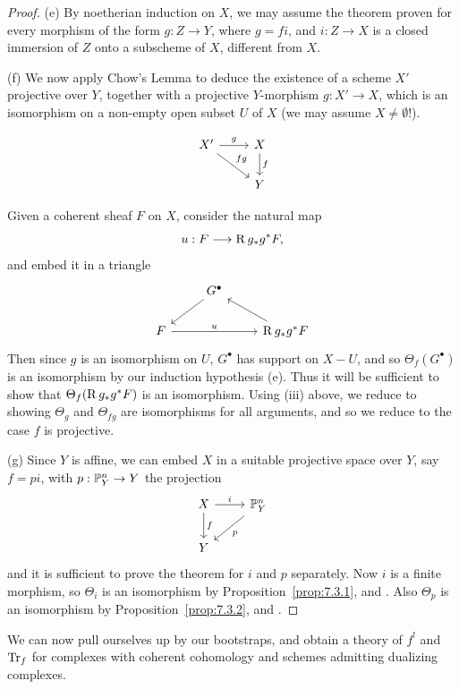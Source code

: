 \begin{proof}
\medskip\noindent(e) By noetherian induction on $X$, we may assume the theorem proven for every morphism of the form $g: Z \to Y$, where $g = fi$, and $i: Z \to X$ is a closed immersion of $Z$ onto a subscheme of $X$, different from $X$.

\medskip\noindent(f) We now apply Chow's Lemma \cite[\nopp II,~5.6.1]{EGA} to deduce the existence of a scheme $X'$ projective over $Y$, together with a projective $Y$-morphism $g: X' \to X$, which is an isomorphism on a non-empty open subset $U$ of $X$ (we may assume $X \neq \emptyset$!).

\[
\begin{tikzcd}
X'\ar[r,"g"]\ar[rd,"fg"]&X\ar[d,"f"]\\
&Y
\end{tikzcd}
\]

Given a coherent sheaf $F$ on $X$, consider the natural map
\[
u: F \longrightarrow \operatorname{R} g_{*} g^{*}F,
\]
and embed it in a triangle
\[
\begin{tikzcd}
	&G^\bullet \ar[ld] \\
	F \ar[rr,"u"]&&\RR g_{*} g^{*}F \ar[lu]
\end{tikzcd}
\]
Then since $g$ is an isomorphism on $U$, $G^{\bullet}$ has support on $X - U$, and so $\Theta_{f}(G^{\bullet})$ is an isomorphism by our induction hypothesis (e). Thus it will be sufficient to show that $\Theta_{f}(\operatorname{R} g_{*} g^{*}F)$ is an isomorphism. Using (iii) above, we reduce to showing $\Theta_{g}$ and $\Theta_{fg}$ are isomorphisms for all arguments, and so we reduce to the case $f$ is projective.

\medskip\noindent(g) Since $Y$ is affine, we can embed $X$ in a suitable projective space over $Y$, say $f = pi$, with $p:\mathbb{P}^n_{Y}\rightarrow Y$ the projection
\[
\begin{tikzcd}
	X\ar[d,"f"]\ar[r,"i"]&\bbP^n_{Y}\ar[ld,"p"] \\
	Y
\end{tikzcd}
\]
and it is sufficient to prove the theorem for $i$ and $p$ separately. Now $i$ is a finite morphism, so $\Theta_{i}$ is an isomorphism by Proposition~\ref{prop:7.3.1}, and . Also $\Theta_{p}$ is an isomorphism by Proposition~\ref{prop:7.3.2}, and .
\end{proof}

We can now pull ourselves up by our bootstraps, and obtain a theory of $f^{!}$ and $\operatorname{Tr}_{f}$ for complexes with coherent cohomology and schemes admitting dualizing complexes.


